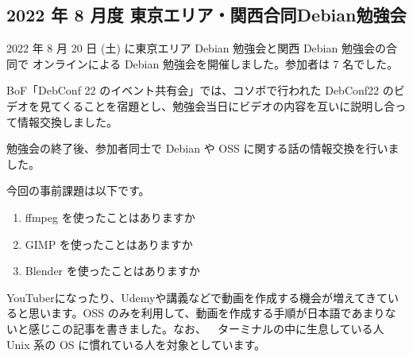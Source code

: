 \documentclass[mingoth,a4paper]{jsarticle}
\begin{document}

\subsection{2022 年 8 月度 東京エリア・関西合同Debian勉強会}

2022 年 8 月 20 日 (土) に東京エリア Debian 勉強会と関西 Debian 勉強会の合同で
オンラインによる Debian 勉強会を開催しました。参加者は 7 名でした。

BoF「DebConf 22 のイベント共有会」では、コソボで行われた DebConf22 のビデオを見てくることを宿題とし、勉強会当日にビデオの内容を互いに説明し合って情報交換しました。

勉強会の終了後、参加者同士で Debian や OSS に関する話の情報交換を行いました。



今回の事前課題は以下です。

\begin{enumerate}
\item ffmpeg を使ったことはありますか
\item GIMP を使ったことはありますか
\item Blender を使ったことはありますか
\end{enumerate}


\begin{multicols}{2}
{\small

}
\end{multicols}

%
%
%
%


      

YouTuberになったり、Udemyや講義などで動画を作成する機会が増えてきていると思います。OSS のみを利用して、動画を作成する手順が日本語であまりないと感じこの記事を書きました。なお、~~ターミナルの中に生息している人~~ Unix 系の OS に慣れている人を対象としています。
\end{document}
